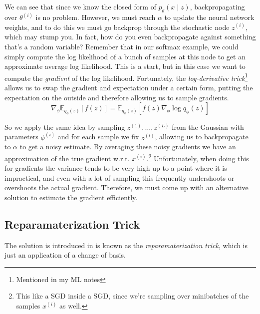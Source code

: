   We can see that since we know the closed form of $p_\theta (x \mid z)$, backpropagating over $\theta^{(i)}$ is no problem. However, we must reach $\alpha$ to update the neural network weights, and to do this we must go backprop through the stochastic node $z^{(i)}$, which may stump you. In fact, how do you even backpropagate against something that's a random variable? Remember that in our softmax example, we could simply compute the log likelihood of a bunch of samples at this node to get an approximate average log likelihood. This is a start, but in this case we want to compute the \textit{gradient} of the log likelihood. Fortunately, the \textit{log-derivative trick}\footnote{Mentioned in my ML notes} allows us to swap the gradient and expectation under a certain form, putting the expectation on the outside and therefore allowing us to sample gradients. 
  \begin{equation}
    \nabla_\phi \mathbb{E}_{q_\phi (z)} [f(z)] = \mathbb{E}_{q_\phi (z)} [ f(z) \nabla_\phi \log q_{\phi} (z)]
  \end{equation}

  So we apply the same idea by sampling $z^{(1)}, \ldots, z^{(L)}$ from the Gaussian with parameters $\phi^{(i)}$ and for each sample we fix $z^{(l)}$, allowing us to backpropagate to $\alpha$ to get a noisy estimate. By averaging these noisy gradients we have an approximation of the true gradient w.r.t. $x^{(i)}$.\footnote{This like a SGD inside a SGD, since we're sampling over minibatches of the samples $x^{(i)}$ as well.} Unfortunately, when doing this for gradients the variance tends to be very high up to a point where it is impractical, and even with a lot of sampling this frequently undershoots or overshoots the actual gradient. Therefore, we must come up with an alternative solution to estimate the gradient efficiently. 


\subsection{Reparamaterization Trick} 

  The solution is introduced in \cite{vae} is known as the \textit{reparamaterization trick}, which is just an application of a change of basis. 

